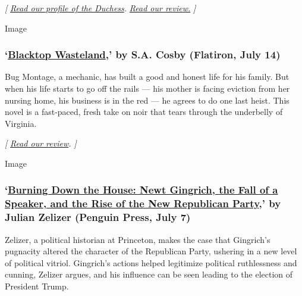 \emph{{[}}
\href{https://www.nytimes.com/2020/07/01/books/becoming-duchess-goldblatt-memoir.html}{\emph{Read
our profile of the Duchess}}\emph{. \textbar{}}
\href{https://www.nytimes.com/2020/07/07/books/review/becoming-duchess-goldblatt-anonymous.html}{\emph{Read
our review.}} \emph{{]}}

Image

\hypertarget{blacktop-wasteland-by-sa-cosby-flatiron-july-14}{%
\subsubsection{\texorpdfstring{`\href{https://us.macmillan.com/books/9781250252685}{Blacktop
Wasteland},' by S.A. Cosby (Flatiron, July
14)}{`Blacktop Wasteland,' by S.A. Cosby (Flatiron, July 14)}}\label{blacktop-wasteland-by-sa-cosby-flatiron-july-14}}

Bug Montage, a mechanic, has built a good and honest life for his
family. But when his life starts to go off the rails --- his mother is
facing eviction from her nursing home, his business is in the red --- he
agrees to do one last heist. This novel is a fast-paced, fresh take on
noir that tears through the underbelly of Virginia.

\emph{{[}}
\href{https://www.nytimes.com/2020/07/17/books/review/blacktop-wasteland-s-a-crosby.html}{\emph{Read
our review}}\emph{. {]}}

Image

\hypertarget{burning-down-the-house-newt-gingrich-the-fall-of-a-speaker-and-the-rise-of-the-new-republican-party-by-julian-zelizer-penguin-press-july-7}{%
\subsubsection{\texorpdfstring{`\href{https://www.penguinrandomhouse.com/books/318517/burning-down-the-house-by-julian-e-zelizer/}{Burning
Down the House: Newt Gingrich, the Fall of a Speaker, and the Rise of
the New Republican Party},' by Julian Zelizer (Penguin Press, July
7)}{`Burning Down the House: Newt Gingrich, the Fall of a Speaker, and the Rise of the New Republican Party,' by Julian Zelizer (Penguin Press, July 7)}}\label{burning-down-the-house-newt-gingrich-the-fall-of-a-speaker-and-the-rise-of-the-new-republican-party-by-julian-zelizer-penguin-press-july-7}}

Zelizer, a political historian at Princeton, makes the case that
Gingrich's pugnacity altered the character of the Republican Party,
ushering in a new level of political vitriol. Gingrich's actions helped
legitimize political ruthlessness and cunning, Zelizer argues, and his
influence can be seen leading to the election of President Trump.


